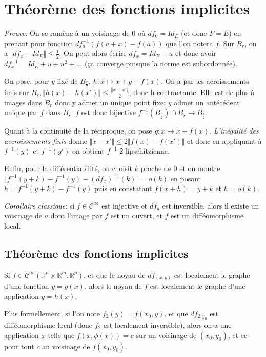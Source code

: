 \documentclass[a4paper]{article}
\begin{document}
\section{Théorème des fonctions implicites}

\textit{Preuve}: On se ramène à un voisinage de 0 où $df_0=Id_E$ (et donc $F=E$) en prenant pour fonction $df_a^{-1}(f(a+x)-f(a))$ que l'on notera $f$. Sur $B_r$, on a $\Vert df_x-Id_E \Vert \leq \frac{1}{2}$. On peut alors écrire $df_x=Id_E-u$ et donc avoir $df_x^{-1}=Id_E+u+u^2+...$ (ça converge puisque la norme est subordonnée).

On pose, pour $y$ fixé de $B_{\frac{r}{2}}$, $h:x\mapsto x+y-f(x)$. On a par les acroissements finis sur $B_r, \Vert h(x) - h(x')\Vert\leq\frac{\Vert x-x' \Vert}{2}$, donc h contractante. Elle est de plus à images dans $B_r$ donc y admet un unique point fixe: $y$ admet un antécédent unique par $f$ dans $B_r$. $f$ est donc bijective $f^{-1}(B_\frac{r}{2}) \cap B_r \to B_{\frac{r}{2}}$.

Quant à la continuité de la réciproque, on pose $g:x\mapsto x-f(x)$. \textit{L'inégalité des accroissements finis} donne $\Vert x-x' \Vert\leq 2\Vert f(x) - f(x')\Vert$ et donc en appliquant à $f^{-1}(y)$ et $f^{-1}(y')$ on obtient $f^{-1}$ 2-lipschitzienne.

Enfin, pour la différentiabilité, on choisit $k$ proche de 0 et on montre $\Vert f^{-1}(y+k)-f^{-1}(y)-(df_x)^{-1}(k) \Vert=o(k)$ en posant $h=f^{-1}(y+k)-f^{-1}(y)$ puis en constatant $f(x+h)=y+k$ et $h=o(k)$.

\bigskip

\textit{Corollaire classique}: si $f\in\mathcal{C}^{\infty}$ est injective et $df_a$ est inversible, alors il existe un voisinage de $a$ dont l'image par $f$ est un ouvert, et $f$ est un difféomorphisme local.

\subsection{Théorème des fonctions implicites}

Si $f\in\mathcal{C}^{\infty}(\mathbb{R}^n\times\mathbb{R}^m,\mathbb{R}^p)$, et que le noyau de $df_{(x,y)}$ est localement le graphe d'une fonction $y=g(x)$, alors le noyau de $f$ est localement le graphe d'une application $y=h(x)$.

Plus formellement, si l'on note $f_2(y) = f(x_0, y)$, et que $df_{2,y_0}$ est difféomorphisme local (donc $f_2$ est localement inversible), alors on a une application $\phi$ telle que $f(x,\phi(x))=c$ sur un voisinage de $(x_0,y_0)$, et ce pour tout $c$ au voisinage de $f(x_0,y_0)$.
\end{document}

